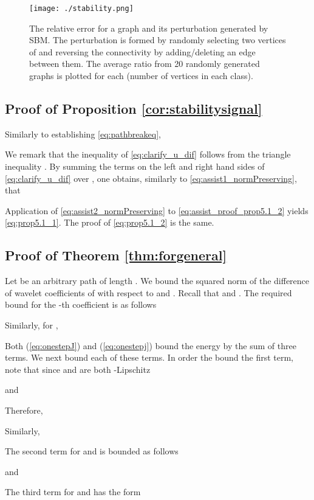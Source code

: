 \documentclass{article}
\begin{document}
\begin{figure}[!ht]
    \centering
    \texttt{[image: ./stability.png]}
	\caption{The relative error  for a graph  and its perturbation  generated by SBM. The perturbation 
is formed by randomly selecting two vertices of  and reversing the connectivity by adding/deleting an edge between them.
The average ratio from 20 randomly generated graphs is plotted for each  (number of vertices in each class).}
    \label{fig:sbmStability}
\end{figure}




\subsection{Proof of Proposition \ref{cor:stabilitysignal}}

{
Similarly to establishing \eqref{eq:pathbreakeq},

We remark that the inequality of \eqref{eq:clarify_u_dif} follows from the triangle inequality . 
By summing the terms on the left and right hand sides of \eqref{eq:clarify_u_dif}  over , one obtains, similarly to \eqref{eq:assist1_normPreserving}, that 

Application of \eqref{eq:assist2_normPreserving} to \eqref{eq:assist_proof_prop5.1_2} yields \eqref{eq:prop5.1_1}. The proof of \eqref{eq:prop5.1_2} is the same.
}


\subsection{Proof of Theorem \ref{thm:forgeneral}}
Let  be an arbitrary path of length . We bound the squared norm of the difference of wavelet coefficients of  with respect to  and . Recall that  and . The required bound for the -th coefficient is as follows

Similarly, for , 


Both (\ref{eq:onestepJ}) and (\ref{eq:onestepj}) bound the energy by the sum of three terms. We next bound each of these terms. In order the bound the first term, note that since  and  are both -Lipschitz

and

Therefore,

Similarly,



The second term for  and  is bounded as follows

and


The third term for  and  has the form
\end{document}
